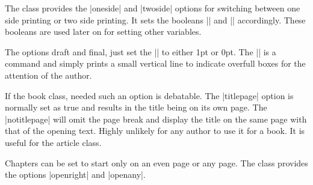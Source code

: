 \begin{multicols}{2}
 The class provides the |oneside| and |twoside| options for switching between one side printing or two side printing.  It sets the booleans |\if@twoside| and |\if@mparswitch| accordingly. These booleans are used later on for setting other variables.
\end{multicols}
\begin{teX}
\if@compatibility\else
{}
\fi
{}
\end{teX}

\begin{multicols}{2}
 The options draft and final, just set the |\overfullrule| to either 1pt or 0pt. The |\overfullrule| is a \tex command and simply prints a small vertical line to indicate overfull boxes for the attention of the author. 
\end{multicols}

\begin{teX}
\if@compatibility\else
{}
\fi
\end{teX}

\begin{multicols}{2}
 If the book class, needed such an option is debatable. The |titlepage| option is normally set as true and results in the title being on its own page. The |notitlepage| will omit the page break and display the title on the same page with that of the opening text. Highly unlikely for any author to use it for a book. It is useful for the article class.
\end{multicols}

\begin{teX}
\if@compatibility\else
{}
\fi
\end{teX}

\begin{multicols}{2}
 Chapters can be set to start only on an even page or any page. The class provides the options |openright| and |openany|.
\end{multicols}


\begin{teX}
\if@compatibility
\@openrighttrue
\else
{}
\fi
\end{teX}



